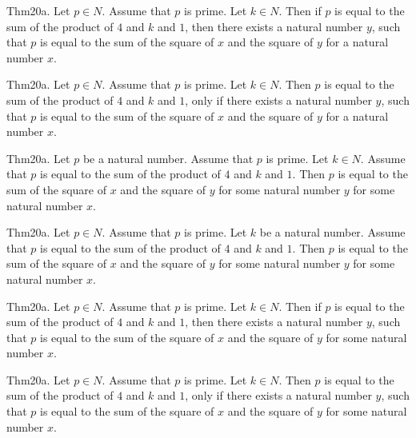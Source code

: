 \documentclass{article}
\begin{document}
Thm20a. Let $p \in N$. Assume that $p$ is prime. Let $k \in N$. Then if $p$ is equal to the sum of the product of $4$ and $k$ and $1$, then there exists a natural number $y$, such that $p$ is equal to the sum of the square of $x$ and the square of $y$ for a natural number $x$.

Thm20a. Let $p \in N$. Assume that $p$ is prime. Let $k \in N$. Then $p$ is equal to the sum of the product of $4$ and $k$ and $1$, only if there exists a natural number $y$, such that $p$ is equal to the sum of the square of $x$ and the square of $y$ for a natural number $x$.

Thm20a. Let $p$ be a natural number. Assume that $p$ is prime. Let $k \in N$. Assume that $p$ is equal to the sum of the product of $4$ and $k$ and $1$. Then $p$ is equal to the sum of the square of $x$ and the square of $y$ for some natural number $y$ for some natural number $x$.

Thm20a. Let $p \in N$. Assume that $p$ is prime. Let $k$ be a natural number. Assume that $p$ is equal to the sum of the product of $4$ and $k$ and $1$. Then $p$ is equal to the sum of the square of $x$ and the square of $y$ for some natural number $y$ for some natural number $x$.

Thm20a. Let $p \in N$. Assume that $p$ is prime. Let $k \in N$. Then if $p$ is equal to the sum of the product of $4$ and $k$ and $1$, then there exists a natural number $y$, such that $p$ is equal to the sum of the square of $x$ and the square of $y$ for some natural number $x$.

Thm20a. Let $p \in N$. Assume that $p$ is prime. Let $k \in N$. Then $p$ is equal to the sum of the product of $4$ and $k$ and $1$, only if there exists a natural number $y$, such that $p$ is equal to the sum of the square of $x$ and the square of $y$ for some natural number $x$.
\end{document}
